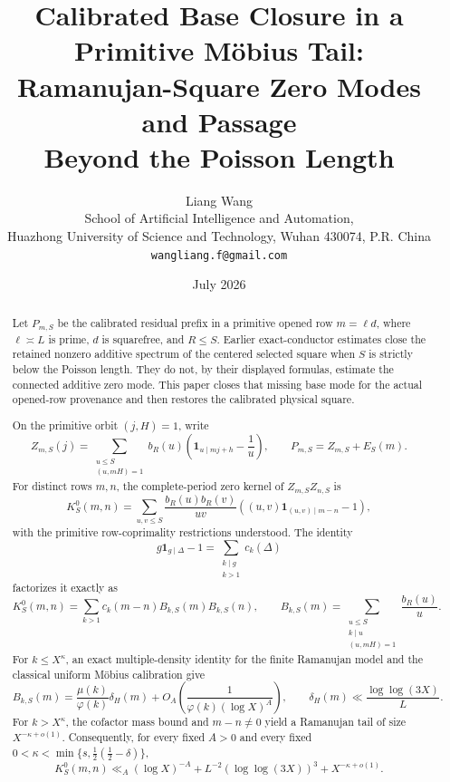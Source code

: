 \documentclass[11pt]{article}
\title{\textbf{Calibrated Base Closure in a Primitive M\"obius Tail:}\\
\textbf{Ramanujan-Square Zero Modes and Passage}\\
\textbf{Beyond the Poisson Length}}
\author{Liang Wang\\
\small School of Artificial Intelligence and Automation,\\[-0.2em]
\small Huazhong University of Science and Technology, Wuhan 430074, P.R. China\\
\small \texttt{wangliang.f@gmail.com}}
\date{July 2026}
\theoremstyle{definition}
\theoremstyle{remark}
\newcommand{\one}{\mathbf 1}
\begin{document}
\maketitle

\begin{abstract}
Let \(P_{m,S}\) be the calibrated residual prefix in a primitive
opened row \(m=\ell d\), where \(\ell\asymp L\) is prime, \(d\) is
squarefree, and \(R\le S\).  Earlier exact-conductor estimates close
the retained nonzero additive spectrum of the centered selected square
when \(S\) is strictly below the Poisson length.  They do not, by their
displayed formulas, estimate the connected additive zero mode.  This
paper closes that missing base mode for the actual opened-row
provenance and then restores the calibrated physical square.

On the primitive orbit \((j,H)=1\), write
\[
 Z_{m,S}(j)=\sum_{\substack{u\le S\\(u,mH)=1}}
 b_R(u)\left(\one_{u\mid mj+h}-\frac1u\right),
 \qquad P_{m,S}=Z_{m,S}+E_S(m).
\]
For distinct rows \(m,n\), the complete-period zero kernel of
\(Z_{m,S}Z_{n,S}\) is
\[
 K_S^0(m,n)=
 \sum_{u,v\le S}\frac{b_R(u)b_R(v)}{uv}
 \left((u,v)\one_{(u,v)\mid m-n}-1\right),
\]
with the primitive row-coprimality restrictions understood.  The
identity
\[
 g\one_{g\mid\Delta}-1
 =\sum_{\substack{k\mid g\\k>1}}c_k(\Delta)
\]
factorizes it exactly as
\[
 K_S^0(m,n)=\sum_{k>1}c_k(m-n)B_{k,S}(m)B_{k,S}(n),
 \qquad
 B_{k,S}(m)=
 \sum_{\substack{u\le S\\k\mid u\\(u,mH)=1}}
 \frac{b_R(u)}u.
\]
For \(k\le X^\kappa\), an exact multiple-density identity for the
finite Ramanujan model and the classical uniform M\"obius calibration
give
\[
 B_{k,S}(m)=\frac{\mu(k)}{\varphi(k)}\delta_H(m)
 +O_A\!\left(\frac1{\varphi(k)(\log X)^A}\right),
 \qquad
 \delta_H(m)\ll \frac{\log\log(3X)}L.
\]
For \(k>X^\kappa\), the cofactor mass bound and \(m-n\ne0\) yield a
Ramanujan tail of size \(X^{-\kappa+o(1)}\).  Consequently, for every
fixed \(A>0\) and every fixed
\(0<\kappa<\min\{s,\tfrac12(\tfrac12-\delta)\}\),
\[
 K_S^0(m,n)
 \ll_A (\log X)^{-A}
 +L^{-2}(\log\log(3X))^3+X^{-\kappa+o(1)}.
\]


\end{abstract}
\end{document}
